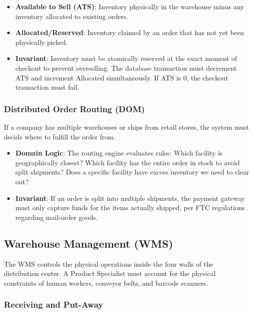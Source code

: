 \documentclass[
  11pt,
  openany,
  oneside]{book}
\providecommand{\tightlist}{%
  \setlength{\itemsep}{0pt}\setlength{\parskip}{0pt}}
\begin{document}
\begin{itemize}
\tightlist
\item
  \textbf{Available to Sell (ATS)}: Inventory physically in the
  warehouse minus any inventory allocated to existing orders.
\item
  \textbf{Allocated/Reserved}: Inventory claimed by an order that has
  not yet been physically picked.
\item
  \textbf{Invariant}: Inventory must be atomically reserved at the exact
  moment of checkout to prevent overselling. The database transaction
  must decrement ATS and increment Allocated simultaneously. If ATS is
  0, the checkout transaction must fail.
\end{itemize}

\subsubsection{Distributed Order Routing
(DOM)}\label{distributed-order-routing-dom}

If a company has multiple warehouses or ships from retail stores, the
system must decide where to fulfill the order from.

\begin{itemize}
\tightlist
\item
  \textbf{Domain Logic}: The routing engine evaluates rules: Which
  facility is geographically closest? Which facility has the entire
  order in stock to avoid split shipments? Does a specific facility have
  excess inventory we need to clear out?
\item
  \textbf{Invariant}: If an order is split into multiple shipments, the
  payment gateway must only capture funds for the items actually
  shipped, per FTC regulations regarding mail-order goods.
\end{itemize}

\subsection{Warehouse Management (WMS)}\label{warehouse-management-wms}

The WMS controls the physical operations inside the four walls of the
distribution center. A Product Specialist must account for the physical
constraints of human workers, conveyor belts, and barcode scanners.

\subsubsection{Receiving and Put-Away}\label{receiving-and-put-away}
\end{document}
